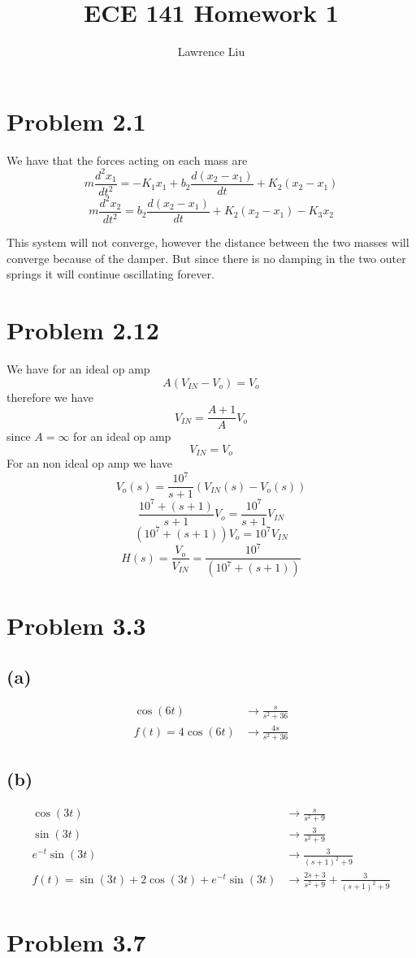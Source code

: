 \documentclass[12pt]{article}
\title{ECE 141 Homework 1}
\author{Lawrence Liu}
\begin{document}
\maketitle
\section*{Problem 2.1}
We have that the forces acting on each mass are
$$m\frac{d^2x_1}{dt^2}=-K_1x_1+b_2\frac{d(x_2-x_1)}{dt}+K_2(x_2-x_1)$$
$$m\frac{d^2x_2}{dt^2}=b_2\frac{d(x_2-x_1)}{dt}+K_2(x_2-x_1)-K_3x_2$$

This system will not converge, however the distance between the two masses will converge because of the damper. But since there is no damping in the two outer springs it will continue oscillating forever.
\section*{Problem 2.12}
We have for an ideal op amp
$$A(V_{IN}-V_o)=V_o$$
therefore we have
$$V_{IN}=\frac{A+1}{A}V_o$$
since $A=\infty$ for an ideal op amp
$$V_{IN}=V_o$$
For an non ideal op amp we have
$$V_o(s)=\frac{10^7}{s+1}(V_{IN}(s)-V_o(s))$$
$$\frac{10^7+(s+1)}{s+1}V_{o}=\frac{10^7}{s+1}V_{IN}$$
$$(10^7+(s+1))V_{o}=10^7V_{IN}$$
$$H(s)=\boxed{\frac{V_o}{V_{IN}}=\frac{10^7}{(10^7+(s+1))}}$$
\section*{Problem 3.3}
\subsection*{(a)}
\begin{align*}
\cos(6t)&\to\frac{s}{s^2+36}\\
f(t)=4\cos(6t)&\to\boxed{\frac{4s}{s^2+36}}
\end{align*}

\subsection*{(b)}
\begin{align*}
\cos(3t)&\to\frac{s}{s^2+9}\\
\sin(3t)&\to\frac{3}{s^2+9}\\
e^{-t}\sin(3t)&\to\frac{3}{(s+1)^2+9}\\
f(t)=\sin(3t)+2\cos(3t)+e^{-t}\sin(3t)&\to\boxed{\frac{2s+3}{s^2+9}+\frac{3}{(s+1)^2+9}}
\end{align*}
\section*{Problem 3.7}
\end{document}
